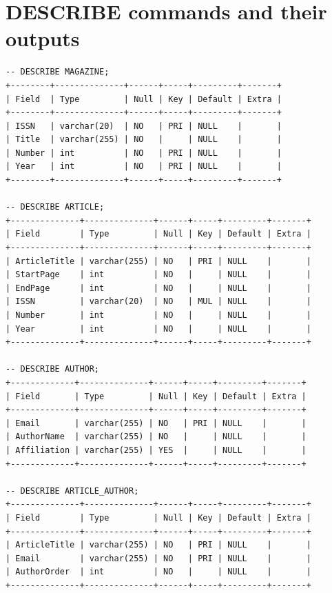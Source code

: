 \documentclass[11pt,a4paper]{article}
\begin{document}
\section{DESCRIBE commands and their outputs}
\begin{Verbatim}
-- DESCRIBE MAGAZINE;
+--------+--------------+------+-----+---------+-------+
| Field  | Type         | Null | Key | Default | Extra |
+--------+--------------+------+-----+---------+-------+
| ISSN   | varchar(20)  | NO   | PRI | NULL    |       |
| Title  | varchar(255) | NO   |     | NULL    |       |
| Number | int          | NO   | PRI | NULL    |       |
| Year   | int          | NO   | PRI | NULL    |       |
+--------+--------------+------+-----+---------+-------+

-- DESCRIBE ARTICLE;
+--------------+--------------+------+-----+---------+-------+
| Field        | Type         | Null | Key | Default | Extra |
+--------------+--------------+------+-----+---------+-------+
| ArticleTitle | varchar(255) | NO   | PRI | NULL    |       |
| StartPage    | int          | NO   |     | NULL    |       |
| EndPage      | int          | NO   |     | NULL    |       |
| ISSN         | varchar(20)  | NO   | MUL | NULL    |       |
| Number       | int          | NO   |     | NULL    |       |
| Year         | int          | NO   |     | NULL    |       |
+--------------+--------------+------+-----+---------+-------+

-- DESCRIBE AUTHOR;
+-------------+--------------+------+-----+---------+-------+
| Field       | Type         | Null | Key | Default | Extra |
+-------------+--------------+------+-----+---------+-------+
| Email       | varchar(255) | NO   | PRI | NULL    |       |
| AuthorName  | varchar(255) | NO   |     | NULL    |       |
| Affiliation | varchar(255) | YES  |     | NULL    |       |
+-------------+--------------+------+-----+---------+-------+

-- DESCRIBE ARTICLE_AUTHOR;
+--------------+--------------+------+-----+---------+-------+
| Field        | Type         | Null | Key | Default | Extra |
+--------------+--------------+------+-----+---------+-------+
| ArticleTitle | varchar(255) | NO   | PRI | NULL    |       |
| Email        | varchar(255) | NO   | PRI | NULL    |       |
| AuthorOrder  | int          | NO   |     | NULL    |       |
+--------------+--------------+------+-----+---------+-------+
\end{Verbatim}
\end{document}
